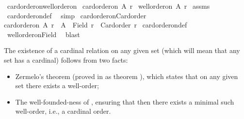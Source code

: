 \begin{isabellebody}
\ card{\isacharunderscore}{\kern0pt}order{\isacharunderscore}{\kern0pt}on{\isacharunderscore}{\kern0pt}well{\isacharunderscore}{\kern0pt}order{\isacharunderscore}{\kern0pt}on{\isacharcolon}{\kern0pt}\isanewline
{}\ {\isachardoublequoteopen}card{\isacharunderscore}{\kern0pt}order{\isacharunderscore}{\kern0pt}on\ A\ r{\isachardoublequoteclose}\isanewline
{}\ {\isachardoublequoteopen}well{\isacharunderscore}{\kern0pt}order{\isacharunderscore}{\kern0pt}on\ A\ r{\isachardoublequoteclose}\isanewline
%
\isadelimproof
%
\endisadelimproof
%
\isatagproof
{}\isamarkupfalse%
\ assms\ \isamarkupfalse%
\ card{\isacharunderscore}{\kern0pt}order{\isacharunderscore}{\kern0pt}on{\isacharunderscore}{\kern0pt}def\ \isamarkupfalse%
\ simp%
\endisatagproof
{\isafoldproof}%
%
\isadelimproof
\isanewline
%
\endisadelimproof
\isanewline
{}\isamarkupfalse%
\ card{\isacharunderscore}{\kern0pt}order{\isacharunderscore}{\kern0pt}on{\isacharunderscore}{\kern0pt}Card{\isacharunderscore}{\kern0pt}order{\isacharcolon}{\kern0pt}\isanewline
{\isachardoublequoteopen}card{\isacharunderscore}{\kern0pt}order{\isacharunderscore}{\kern0pt}on\ A\ r\ {\isasymLongrightarrow}\ A\ {\isacharequal}{\kern0pt}\ Field\ r\ {\isasymand}\ Card{\isacharunderscore}{\kern0pt}order\ r{\isachardoublequoteclose}\isanewline
%
\isadelimproof
%
\endisadelimproof
%
\isatagproof
{}\isamarkupfalse%
\ card{\isacharunderscore}{\kern0pt}order{\isacharunderscore}{\kern0pt}on{\isacharunderscore}{\kern0pt}def\ \isamarkupfalse%
\ well{\isacharunderscore}{\kern0pt}order{\isacharunderscore}{\kern0pt}on{\isacharunderscore}{\kern0pt}Field\ \isamarkupfalse%
\ blast%
\endisatagproof
{\isafoldproof}%
%
\isadelimproof
%
\endisadelimproof
%
\begin{isamarkuptext}%
The existence of a cardinal relation on any given set (which will mean
that any set has a cardinal) follows from two facts:
\begin{itemize}
\item Zermelo's theorem (proved in  as theorem ),
which states that on any given set there exists a well-order;
\item The well-founded-ness of , ensuring that then there exists a minimal
such well-order, i.e., a cardinal order.
\end{itemize}%
\end{isamarkuptext}\isamarkuptrue%

\end{isabellebody}
